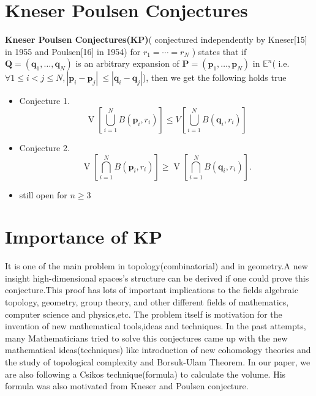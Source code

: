 \section{Kneser Poulsen Conjectures}
\textbf{Kneser Poulsen Conjectures(KP)}( conjectured independently by Kneser[15] in 1955 and Poulsen[16] in  1954) for $r_{1}=\cdots=r_{N}$ ) states that if $\boldsymbol{Q}=\left(\boldsymbol{q}_{1}, \ldots, \boldsymbol{q}_{N}\right)$ is an arbitrary expansion of $\boldsymbol{P}=\left(\boldsymbol{p}_{1}, \ldots, \boldsymbol{p}_{N}\right)$ in $\mathbb{E}^{n}$( i.e. $\forall 1\leq i < j \leq N,  \left|\boldsymbol{p}_{i}-\boldsymbol{p}_{j}\right|\ \leq \left|\boldsymbol{q}_{i}-\boldsymbol{q}_{j}\right|$), then we get the following holds true\\ 
\begin{itemize}
\item Conjecture 1. 
$$
\operatorname{V}\left[\bigcup_{i=1}^{N} B\left(\boldsymbol{p}_{i}, r_{i}\right)\right] \leq {V}\left[\bigcup_{i=1}^{N} B\left(\boldsymbol{q}_{i}, r_{i}\right)\right]
$$
\item Conjecture 2. 
$$
\operatorname{V}\left[\bigcap_{i=1}^{N} B\left(\boldsymbol{p}_{i}, r_{i}\right)\right] \geq \operatorname{V}\left[\bigcap_{i=1}^{N} B\left(\boldsymbol{q}_{i}, r_{i}\right)\right] .
$$
\item still open for $n \geq 3$
\end{itemize}


 \section{Importance of KP}
  It is one of the main problem in topology(combinatorial) and in geometry.A new insight high-dimensional spaces's structure can be derived if one could prove this conjecture.This proof has lots of important implications  to the fields algebraic topology, geometry, group theory, and other different fields of mathematics, computer science and physics,etc. The problem itself is motivation for the  invention of new mathematical tools,ideas and techniques.
In the past attempts, many Mathematicians tried to solve this conjectures came up with the new mathematical ideas(techniques) like  introduction of new cohomology theories and the study of topological  complexity and Borsuk-Ulam Theorem. In our paper, we are also following a Csikos technique(formula) to calculate the volume. His formula was also motivated from Kneser and Poulsen conjecture.\\

